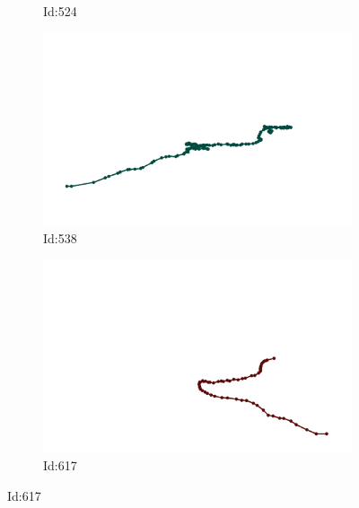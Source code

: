 \documentclass[12pt,twoside]{report}
\begin{document}
\begin{figure}
\begin{subfigure}[b]{0.20\textwidth}
\caption{Id:524}
\end{subfigure}
\begin{subfigure}[b]{0.20\textwidth}
\centering
\includegraphics[width=\textwidth]{../trajectories/538.png}
\caption{Id:538}
\end{subfigure}
\begin{subfigure}[b]{0.20\textwidth}
\centering
\includegraphics[width=\textwidth]{../trajectories/617.png}
\caption{Id:617}
\end{subfigure}
\end{figure}
\end{document}
